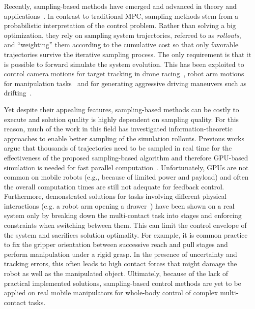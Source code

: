 Recently, sampling-based methods have emerged and advanced in theory and applications~\cite{lee_aggressive_2020,abraham_model-based_2020,williams_information_nodate,williams_information_2017,rajamaki_augmenting_2017}. 
In contrast to traditional MPC, sampling methods stem from a probabilistic interpretation of the control problem. 
Rather than solving a big optimization, they rely on sampling system trajectories, referred to as \emph{rollouts}, and ``weighting'' them according to the cumulative cost so that only favorable trajectories survive the iterative sampling process. The only requirement is that it is possible to forward simulate the system evolution. This has been exploited to control camera motions for target tracking in drone racing~\cite{lee_aggressive_2020}, robot arm motions for manipulation tasks~\cite{abraham_model-based_2020} and for generating aggressive driving maneuvers such as drifting~\cite{williams_information_nodate, williams_information_2017}. 

Yet despite their appealing features, sampling-based methods can be costly to execute and solution quality is highly dependent on sampling quality. For this reason, much of the work in this field has investigated information-theoretic approaches to enable better sampling of the simulation rollouts. Previous works argue that thousands of trajectories need to be sampled in real time for the effectiveness of the proposed sampling-based algorithm and therefore GPU-based simulation is needed for fast parallel computation~\cite{williams_model_2017}. 
Unfortunately, GPUs are not common on mobile robots (e.g., because of limited power and payload) and often the overall computation times are still not adequate for feedback control. 
Furthermore, demonstrated solutions for tasks involving different physical interactions (e.g. a robot arm opening a drawer~\cite{abraham_model-based_2020}) have been shown on a real system only by breaking down the multi-contact task into stages and enforcing constraints when switching between them. 
This can limit the control envelope of the system and sacrifices solution optimality. For example, it is common practice to fix the gripper orientation between successive reach and pull stages and perform manipulation under a rigid grasp. In the presence of uncertainty and tracking errors, this often leads to high contact forces that might damage the robot as well as the manipulated object.
Ultimately, because of the lack of practical implemented solutions, sampling-based control methods are yet to be applied on real mobile manipulators for whole-body control of complex multi-contact tasks.

